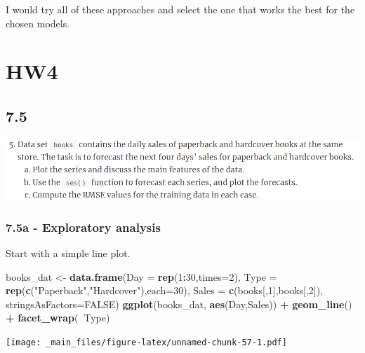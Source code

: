 \documentclass[]{book}
\newenvironment{Shaded}{\begin{snugshade}}{\end{snugshade}}
\newcommand{\DataTypeTok}[1]{\textcolor[rgb]{0.13,0.29,0.53}{#1}}
\newcommand{\DecValTok}[1]{\textcolor[rgb]{0.00,0.00,0.81}{#1}}
\newcommand{\KeywordTok}[1]{\textcolor[rgb]{0.13,0.29,0.53}{\textbf{#1}}}
\newcommand{\NormalTok}[1]{#1}
\newcommand{\OperatorTok}[1]{\textcolor[rgb]{0.81,0.36,0.00}{\textbf{#1}}}
\newcommand{\OtherTok}[1]{\textcolor[rgb]{0.56,0.35,0.01}{#1}}
\newcommand{\StringTok}[1]{\textcolor[rgb]{0.31,0.60,0.02}{#1}}
\begin{document}
I would try all of these approaches and select the one that works the best for the chosen models.

\hypertarget{hw4}{%
\chapter{HW4}\label{hw4}}

\hypertarget{section-9}{%
\section{7.5}\label{section-9}}

\includegraphics{./week4/7.5.png}

\hypertarget{a---exploratory-analysis}{%
\subsection{7.5a - Exploratory analysis}\label{a---exploratory-analysis}}

Start with a simple line plot.

\begin{Shaded}
\begin{Highlighting}[]
\NormalTok{books_dat <-}\StringTok{ }\KeywordTok{data.frame}\NormalTok{(}\DataTypeTok{Day =} \KeywordTok{rep}\NormalTok{(}\DecValTok{1}\OperatorTok{:}\DecValTok{30}\NormalTok{,}\DataTypeTok{times=}\DecValTok{2}\NormalTok{),}
    \DataTypeTok{Type =} \KeywordTok{rep}\NormalTok{(}\KeywordTok{c}\NormalTok{(}\StringTok{"Paperback"}\NormalTok{,}\StringTok{"Hardcover"}\NormalTok{),}\DataTypeTok{each=}\DecValTok{30}\NormalTok{),}
    \DataTypeTok{Sales =} \KeywordTok{c}\NormalTok{(books[,}\DecValTok{1}\NormalTok{],books[,}\DecValTok{2}\NormalTok{]),}
    \DataTypeTok{stringsAsFactors=}\OtherTok{FALSE}\NormalTok{)}
\KeywordTok{ggplot}\NormalTok{(books_dat,}
\KeywordTok{aes}\NormalTok{(Day,Sales)) }\OperatorTok{+}
\KeywordTok{geom_line}\NormalTok{() }\OperatorTok{+}
\KeywordTok{facet_wrap}\NormalTok{(}\OperatorTok{~}\NormalTok{Type)}
\end{Highlighting}
\end{Shaded}

\texttt{[image: \_main\_files/figure-latex/unnamed-chunk-57-1.pdf]}
\end{document}
